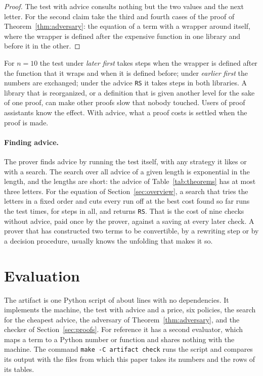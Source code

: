 \documentclass[acmsmall,nonacm,screen]{acmart}
\newcommand{\adv}[1]{\textup{\texttt{#1}}}
\newcommand{\claim}[2]{#2}
\begin{document}
\begin{proof}
The test with advice consults nothing but the two values and the next letter. For the
second claim take the third and fourth cases of the proof of Theorem~\ref{thm:adversary}:
the equation of a term with a wrapper around itself, where the wrapper is defined after the
expensive function in one library and before it in the other.
\end{proof}

\claim{order}{For $n = 10$ the test under \emph{later first} takes \exOrderGood{} steps when
the wrapper is defined after the function that it wraps and \exOrderBad{} when it is defined
before; under \emph{earlier first} the numbers are exchanged; under the advice \adv{RS} it
takes \exOrderAdvice{} steps in both libraries.} A library that is reorganized, or a
definition that is given another level for the sake of one proof, can make other proofs slow
that nobody touched. Users of proof assistants know the effect. With advice, what a proof
costs is settled when the proof is made.

\paragraph{Finding advice.} The prover finds advice by running the test itself, with any
strategy it likes or with a search. The search over all advice of a given length is
exponential in the length, and the lengths are short: the advice of
Table~\ref{tab:theorems} has at most three letters. \claim{search}{For the equation of
Section~\ref{sec:overview}, a search that tries the letters in a fixed order and cuts every
run off at the best cost found so far runs the test \exSearchRuns{} times, for
\exSearchSteps{} steps in all, and returns \adv{RS}.} That is the cost of nine checks without
advice, paid once by the prover, against a saving at every later check. A prover that has constructed two terms
to be convertible, by a rewriting step or by a decision procedure, usually knows the
unfolding that makes it so.

\section{Evaluation}
\label{sec:eval}

The artifact is one Python script of about \exLines{} lines with no dependencies. It
implements the machine, the test with advice and a price, six policies, the search for the
cheapest advice, the adversary of Theorem~\ref{thm:adversary}, and the checker of
Section~\ref{sec:proofs}. For reference it has a second evaluator, which maps a term to a
Python number or function and shares nothing with the machine. The command \texttt{make -C
artifact check} runs the script and compares its output with the files from which this
paper takes its numbers and the rows of its tables.
\end{document}

